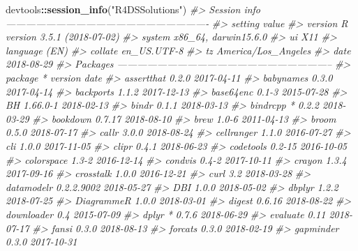 \documentclass[]{book}
\newenvironment{Shaded}{\begin{snugshade}}{\end{snugshade}}
\newcommand{\CommentTok}[1]{\textcolor[rgb]{0.56,0.35,0.01}{\textit{#1}}}
\newcommand{\KeywordTok}[1]{\textcolor[rgb]{0.13,0.29,0.53}{\textbf{#1}}}
\newcommand{\NormalTok}[1]{#1}
\newcommand{\OperatorTok}[1]{\textcolor[rgb]{0.81,0.36,0.00}{\textbf{#1}}}
\newcommand{\StringTok}[1]{\textcolor[rgb]{0.31,0.60,0.02}{#1}}
\theoremstyle{plain}
\theoremstyle{remark}
\begin{document}
\begin{Shaded}
\begin{Highlighting}[]
\NormalTok{devtools}\OperatorTok{::}\KeywordTok{session_info}\NormalTok{(}\StringTok{"R4DSSolutions"}\NormalTok{)}
\CommentTok{#> Session info -------------------------------------------------------------}
\CommentTok{#>  setting  value                       }
\CommentTok{#>  version  R version 3.5.1 (2018-07-02)}
\CommentTok{#>  system   x86_64, darwin15.6.0        }
\CommentTok{#>  ui       X11                         }
\CommentTok{#>  language (EN)                        }
\CommentTok{#>  collate  en_US.UTF-8                 }
\CommentTok{#>  tz       America/Los_Angeles         }
\CommentTok{#>  date     2018-08-29}
\CommentTok{#> Packages -----------------------------------------------------------------}
\CommentTok{#>  package        * version    date      }
\CommentTok{#>  assertthat       0.2.0      2017-04-11}
\CommentTok{#>  babynames        0.3.0      2017-04-14}
\CommentTok{#>  backports        1.1.2      2017-12-13}
\CommentTok{#>  base64enc        0.1-3      2015-07-28}
\CommentTok{#>  BH               1.66.0-1   2018-02-13}
\CommentTok{#>  bindr            0.1.1      2018-03-13}
\CommentTok{#>  bindrcpp       * 0.2.2      2018-03-29}
\CommentTok{#>  bookdown         0.7.17     2018-08-10}
\CommentTok{#>  brew             1.0-6      2011-04-13}
\CommentTok{#>  broom            0.5.0      2018-07-17}
\CommentTok{#>  callr            3.0.0      2018-08-24}
\CommentTok{#>  cellranger       1.1.0      2016-07-27}
\CommentTok{#>  cli              1.0.0      2017-11-05}
\CommentTok{#>  clipr            0.4.1      2018-06-23}
\CommentTok{#>  codetools        0.2-15     2016-10-05}
\CommentTok{#>  colorspace       1.3-2      2016-12-14}
\CommentTok{#>  condvis          0.4-2      2017-10-11}
\CommentTok{#>  crayon           1.3.4      2017-09-16}
\CommentTok{#>  crosstalk        1.0.0      2016-12-21}
\CommentTok{#>  curl             3.2        2018-03-28}
\CommentTok{#>  datamodelr       0.2.2.9002 2018-05-27}
\CommentTok{#>  DBI              1.0.0      2018-05-02}
\CommentTok{#>  dbplyr           1.2.2      2018-07-25}
\CommentTok{#>  DiagrammeR       1.0.0      2018-03-01}
\CommentTok{#>  digest           0.6.16     2018-08-22}
\CommentTok{#>  downloader       0.4        2015-07-09}
\CommentTok{#>  dplyr          * 0.7.6      2018-06-29}
\CommentTok{#>  evaluate         0.11       2018-07-17}
\CommentTok{#>  fansi            0.3.0      2018-08-13}
\CommentTok{#>  forcats          0.3.0      2018-02-19}
\CommentTok{#>  gapminder        0.3.0      2017-10-31}

\end{Highlighting}
\end{Shaded}
\end{document}
